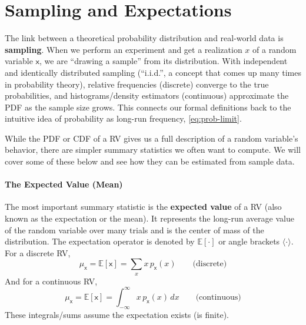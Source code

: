 \section{Sampling and Expectations}
The link between a theoretical probability distribution and real-world data is \textbf{sampling}. When we perform an experiment and get a realization $x$ of a random variable $\mathsf{x}$, we are ``drawing a sample'' from its distribution. With independent and identically distributed sampling (``i.i.d.'', a concept that comes up many times in probability theory), relative frequencies (discrete) converge to the true probabilities, and histograms/density estimators (continuous) approximate the PDF as the sample size grows. This connects our formal definitions back to the intuitive idea of probability as long-run frequency, \autoref{eq:prob-limit}. 

While the PDF or CDF of a RV gives us a full description of a random variable's behavior, there are simpler summary statistics we often want to compute. We will cover some of these below and see how they can be estimated from sample data.

\paragraph*{The Expected Value (Mean)}
The most important summary statistic is the \textbf{expected value} of a RV (also known as the expectation or the mean). It represents the long-run average value of the random variable over many trials and is the center of mass of the distribution. The expectation operator is denoted by $\mathbb{E}[\cdot]$ or angle brackets $\langle\cdot\rangle$. For a discrete RV,
\begin{equation}
    \mu_{\mathsf{x}} = \mathbb{E}[\mathsf{x}] = \sum_{x} x \, p_{\mathsf{x}}(x) \qquad\text{(discrete)}
\end{equation}
And for a continuous RV,
\begin{equation}
    \mu_{\mathsf{x}} = \mathbb{E}[\mathsf{x}] = \int_{-\infty}^{\infty} x \, p_{\mathsf{x}}(x)\,dx \qquad\text{(continuous)}
\end{equation}
These integrals/sums assume the expectation exists (is finite).

